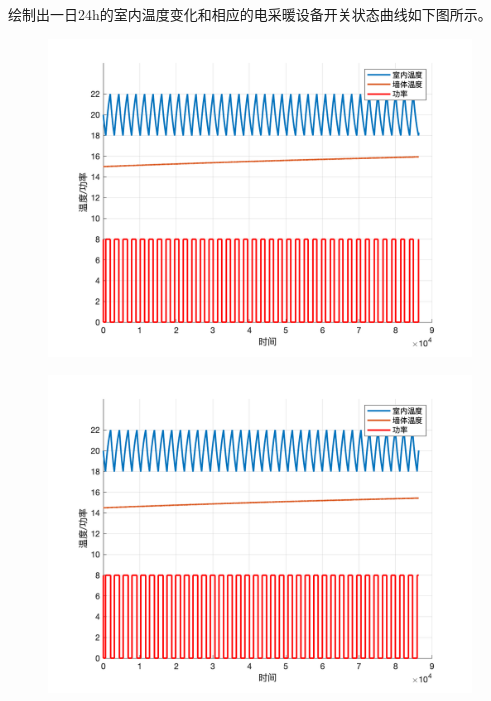 \documentclass[withoutpreface,bwprint]{cumcmthesis} %
\begin{document}
绘制出一日24h的室内温度变化和相应的电采暖设备开关状态曲线如下图所示。
\begin{figure}[H]
    \centering
    \begin{minipage}[c]{0.49\textwidth}
        \includegraphics[width=1\textwidth]{figures/1-20-15.png}
    \label{fig:my_label}
    \end{minipage}
\begin{minipage}[c]{0.49\textwidth}
    \includegraphics[width=1\textwidth]{figures/1-20-15-5.png}
    \label{fig:my_label}
\end{minipage}
\begin{minipage}[c]{0.49\textwidth}

\end{minipage}
\end{figure}
\end{document}
